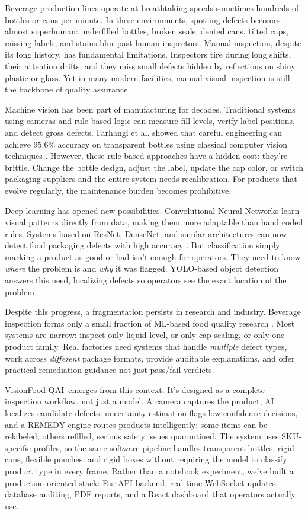 \documentclass[12pt,a4paper]{report}
\newcommand{\shorttitle}{VisionFood QAI}
\begin{document}
Beverage production lines operate at breathtaking speeds-sometimes hundreds of bottles or cans per minute. In these environments, spotting defects becomes almost superhuman: underfilled bottles, broken seals, dented cans, tilted caps, missing labels, and stains blur past human inspectors. Manual inspection, despite its long history, has fundamental limitations. Inspectors tire during long shifts, their attention drifts, and they miss small defects hidden by reflections on shiny plastic or glass. Yet in many modern facilities, manual visual inspection is still the backbone of quality assurance.

Machine vision has been part of manufacturing for decades. Traditional systems using cameras and rule-based logic can measure fill levels, verify label positions, and detect gross defects. Farhangi et al. showed that careful engineering can achieve 95.6\% accuracy on transparent bottles using classical computer vision techniques \cite{farhangi2024machine}. However, these rule-based approaches have a hidden cost: they're brittle. Change the bottle design, adjust the label, update the cap color, or switch packaging suppliers and the entire system needs recalibration. For products that evolve regularly, the maintenance burden becomes prohibitive.

Deep learning has opened new possibilities. Convolutional Neural Networks learn visual patterns directly from data, making them more adaptable than hand coded rules. Systems based on ResNet, DenseNet, and similar architectures can now detect food packaging defects with high accuracy \cite{banus2021thermoforming,subramanian2025resnet}. But classification simply marking a product as good or bad isn't enough for operators. They need to know \emph{where} the problem is and \emph{why} it was flagged. YOLO-based object detection answers this need, localizing defects so operators see the exact location of the problem \cite{kavitha2024deeplearning}.

Despite this progress, a fragmentation persists in research and industry. Beverage inspection forms only a small fraction of ML-based food quality research \cite{liakos2025review}. Most systems are narrow: inspect only liquid level, or only cap sealing, or only one product family. Real factories need systems that handle \emph{multiple} defect types, work across \emph{different} package formats, provide auditable explanations, and offer practical remediation guidance not just pass/fail verdicts.

\shorttitle\ emerges from this context. It's designed as a complete inspection workflow, not just a model. A camera captures the product, AI localizes candidate defects, uncertainty estimation flags low-confidence decisions, and a REMEDY engine routes products intelligently: some items can be relabeled, others refilled, serious safety issues quarantined. The system uses SKU-specific profiles, so the same software pipeline handles transparent bottles, rigid cans, flexible pouches, and rigid boxes without requiring the model to classify product type in every frame. Rather than a notebook experiment, we've built a production-oriented stack: FastAPI backend, real-time WebSocket updates, database auditing, PDF reports, and a React dashboard that operators actually use.
\end{document}
